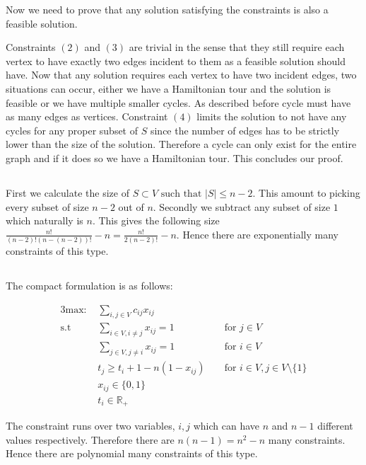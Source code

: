 Now we need to prove that any solution satisfying the constraints is also a feasible solution. 

Constraints $(2)$ and  $(3)$ are trivial in the sense that they still require each vertex to have exactly two edges incident to them as a feasible solution should have. Now that any solution requires each vertex to have two incident edges, two situations can occur, either we have a Hamiltonian tour and the solution is feasible or we have multiple smaller cycles. As described before cycle must have as many edges as vertices. Constraint $(4)$ limits the solution to not have any cycles for any proper subset of $S$ since the number of edges has to be strictly lower than the size of the solution. Therefore a cycle can only exist for the entire graph and if it does so we have a Hamiltonian tour. This concludes our proof.

\subsection{}  %
First we calculate the size of $S \subset V \text{ such that } |S| \leq n - 2$. This amount to picking every subset of size $n-2$ out of $n$. Secondly we subtract any subset of size $1$ which naturally is $n$. This gives the following size $\frac{n!}{(n-2)! (n - (n-2))!}-n = \frac{n!}{2 (n-2)!}-n$. Hence there are exponentially many constraints of this type. 


\subsection{} %

The compact formulation is as follows:

\begin{alignat}{3}
	\text{max: }    & \sum_{i,j \in V} c_{ij} x_{ij}\\
	\text{s.t }     & \sum_{i \in V, i \neq j} x_{ij} = 1  && \text{ for } j \in V\\
	& \sum_{j \in V, j \neq i} x_{ij} = 1  && \text{ for } i \in V\\
	& t_j \geq t_i + 1-n(1-x_{ij})  && \text{ for } i \in V, j \in V \setminus \{1\}\\
	& x_{ij} \in \{0,1\} \\
	& t_i \in \mathbb{R}_+ 
\end{alignat}

The constraint runs over two variables, $i,j$ which can have $n$ and $n-1$ different values respectively. Therefore there are $n(n-1) = n^2-n$ many constraints. Hence there are polynomial many constraints of this type.

